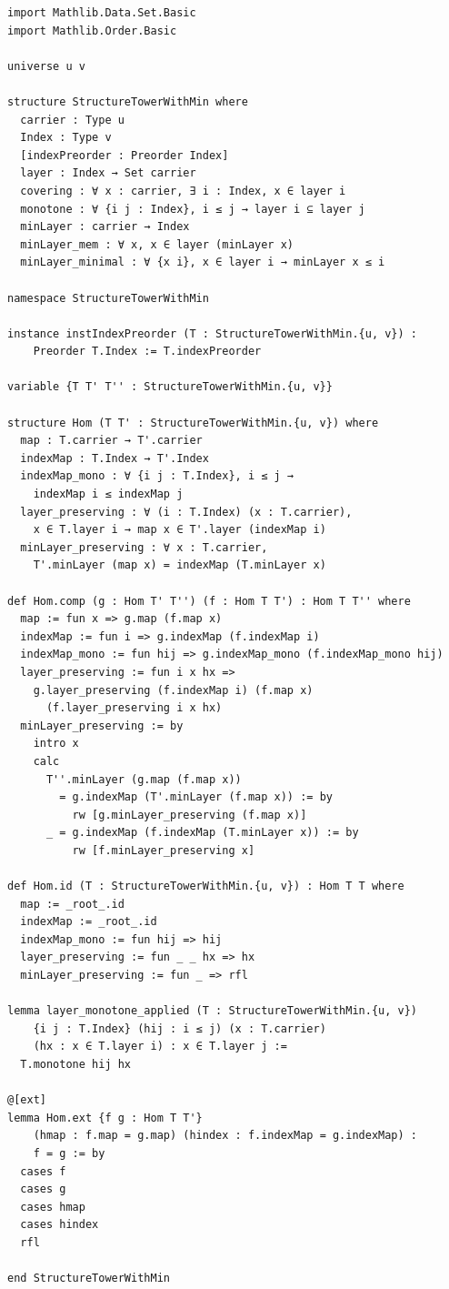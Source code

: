 \documentclass[a4paper,12pt]{article}
\theoremstyle{definition}
\begin{document}
\begin{verbatim}
import Mathlib.Data.Set.Basic
import Mathlib.Order.Basic

universe u v

structure StructureTowerWithMin where
  carrier : Type u
  Index : Type v
  [indexPreorder : Preorder Index]
  layer : Index → Set carrier
  covering : ∀ x : carrier, ∃ i : Index, x ∈ layer i
  monotone : ∀ {i j : Index}, i ≤ j → layer i ⊆ layer j
  minLayer : carrier → Index
  minLayer_mem : ∀ x, x ∈ layer (minLayer x)
  minLayer_minimal : ∀ {x i}, x ∈ layer i → minLayer x ≤ i

namespace StructureTowerWithMin

instance instIndexPreorder (T : StructureTowerWithMin.{u, v}) : 
    Preorder T.Index := T.indexPreorder

variable {T T' T'' : StructureTowerWithMin.{u, v}}

structure Hom (T T' : StructureTowerWithMin.{u, v}) where
  map : T.carrier → T'.carrier
  indexMap : T.Index → T'.Index
  indexMap_mono : ∀ {i j : T.Index}, i ≤ j → 
    indexMap i ≤ indexMap j
  layer_preserving : ∀ (i : T.Index) (x : T.carrier), 
    x ∈ T.layer i → map x ∈ T'.layer (indexMap i)
  minLayer_preserving : ∀ x : T.carrier, 
    T'.minLayer (map x) = indexMap (T.minLayer x)

def Hom.comp (g : Hom T' T'') (f : Hom T T') : Hom T T'' where
  map := fun x => g.map (f.map x)
  indexMap := fun i => g.indexMap (f.indexMap i)
  indexMap_mono := fun hij => g.indexMap_mono (f.indexMap_mono hij)
  layer_preserving := fun i x hx =>
    g.layer_preserving (f.indexMap i) (f.map x) 
      (f.layer_preserving i x hx)
  minLayer_preserving := by
    intro x
    calc
      T''.minLayer (g.map (f.map x)) 
        = g.indexMap (T'.minLayer (f.map x)) := by
          rw [g.minLayer_preserving (f.map x)]
      _ = g.indexMap (f.indexMap (T.minLayer x)) := by
          rw [f.minLayer_preserving x]

def Hom.id (T : StructureTowerWithMin.{u, v}) : Hom T T where
  map := _root_.id
  indexMap := _root_.id
  indexMap_mono := fun hij => hij
  layer_preserving := fun _ _ hx => hx
  minLayer_preserving := fun _ => rfl

lemma layer_monotone_applied (T : StructureTowerWithMin.{u, v})
    {i j : T.Index} (hij : i ≤ j) (x : T.carrier) 
    (hx : x ∈ T.layer i) : x ∈ T.layer j :=
  T.monotone hij hx

@[ext]
lemma Hom.ext {f g : Hom T T'}
    (hmap : f.map = g.map) (hindex : f.indexMap = g.indexMap) : 
    f = g := by
  cases f
  cases g
  cases hmap
  cases hindex
  rfl

end StructureTowerWithMin
\end{verbatim}
\end{document}
